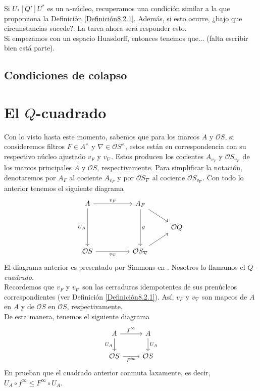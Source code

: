 Si $U_*[Q']U^*$ es un $u$-núcleo, recuperamos una condición similar a la que proporciona la Definición \ref{Definición8.2.1}. Además, si esto ocurre, ¿bajo que circunstancias 
sucede?. La tarea ahora será responder esto.\\

Si empezamos con un espacio Huasdorff, entonces tenemos que... (falta escribir bien está parte).
\subsection{Condiciones de colapso}\label{Intervalos colapsados}

\section{El $Q$-cuadrado}\label{Qcuadrado}

Con lo visto hasta este momento, sabemos que para los marcos $A$ y $\mathcal{O}S$, si consideremos filtros $F\in A^\wedge$ y $\nabla\in \mathcal{O}S^\wedge$, estos están en correspondencia con su respectivo núcleo ajustado
$v_F$ y $v_\nabla$. Estos producen los cocientes $A_{v_F}$ y $\mathcal{O}S_{v_\nabla}$ de los marcos principales $A$ y $\mathcal{O}S$, respectivamente. Para simplificar la notación, denotaremos por $A_F$ al cociente $A_{v_F}$ 
y por $\mathcal{O}S_\nabla$ al cociente $\mathcal{O}S_{v_\nabla}$. Con todo lo anterior tenemos el siguiente diagrama
\[
\begin{tikzcd}
	A && {A_F} \\
	&&& {\mathcal{O}Q} \\
	{\mathcal{O}S} && {\mathcal{O}S_\nabla}
	\arrow["{v_F}", from=1-1, to=1-3]
	\arrow["{U_A}"', from=1-1, to=3-1]
	\arrow[from=1-3, to=2-4]
	\arrow["g", from=1-3, to=3-3]
	\arrow["{v_\nabla}"', from=3-1, to=3-3]
	\arrow[from=3-3, to=2-4]
\end{tikzcd}
\]
El diagrama anterior es presentado por Simmons en \cite{H.S.V}. Nosotros lo llamamos el \emph{$Q$-cuadrado}.\\

Recordemos que $v_F$ y $v_\nabla$ son las cerraduras idempotentes de sus prenúcleos correspondientes (ver Definición \ref{Definición8.2.1}). Así, $v_F$ y $v_\nabla$ son mapeos de $A$ en $A$ y de $\mathcal{O}S$ en $\mathcal{O}S$, respectivamente.\\

De esta manera, tenemos el siguiente diagrama
\[\begin{tikzcd}
	A & A \\
	{\mathcal{O}S} & {\mathcal{O}S}
	\arrow["{f^\infty}", from=1-1, to=1-2]
	\arrow["{U_A}"', from=1-1, to=2-1]
	\arrow["{U_A}", from=1-2, to=2-2]
	\arrow["{F^\infty}"', from=2-1, to=2-2]
\end{tikzcd}\]
En \cite{H.S.V} prueban que el cuadrado anterior conmuta laxamente, es decir, $U_A\circ f^\infty\leq F^\infty \circ U_A$.\\

